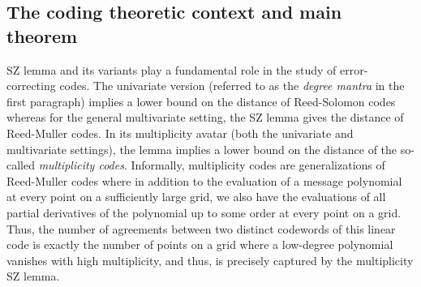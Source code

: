 \documentclass{article}
\begin{document}
	\subsection{The coding theoretic context and main theorem}
	SZ lemma and its variants play a fundamental role in the study of error-correcting codes. The univariate version (referred to as the \emph{degree mantra} in the first paragraph) implies a lower bound on the distance of Reed-Solomon codes whereas for the general multivariate setting, the SZ lemma gives the distance of Reed-Muller codes. In its multiplicity avatar (both the univariate and multivariate settings), the lemma implies a lower bound on the distance of the so-called \emph{multiplicity codes}. Informally, multiplicity codes are generalizations of Reed-Muller codes where in addition to the evaluation of a message polynomial at every point on a sufficiently large grid, we also have the evaluations of all partial derivatives of the polynomial up to some order at every point on a grid. Thus, the number of agreements between two distinct codewords of this linear code is exactly  the number of points on a grid where a low-degree polynomial vanishes with high multiplicity, and thus, is precisely captured by the multiplicity SZ lemma. 
	
\end{document}
